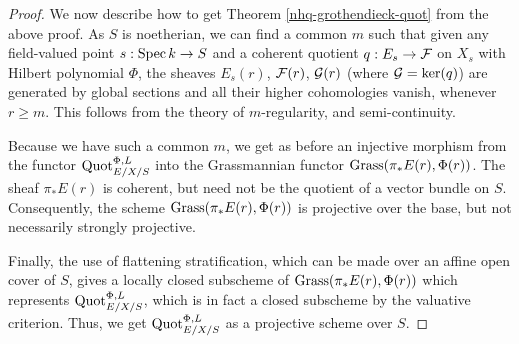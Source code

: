 \begin{proof}
We now describe how to get Theorem \ref{nhq-grothendieck-quot}
from the above proof. As $S$ is noetherian, we can find a common
$m$ such that given any field-valued point
$s: \operatorname{Spec} k\to S$ and a coherent quotient $q: E_s \to \mathcal{F}$ on $X_s$
with Hilbert polynomial $\Phi$,
the sheaves $E_s(r)$, $\mathcal{F}(r)$, $\mathcal{G}(r)$ (where $\mathcal{G} = \operatorname{ker}(q)$) are
generated by global sections and all their higher cohomologies vanish,
whenever $r\ge m$.
This follows from the theory of $m$-regularity, and semi-continuity.

Because we have such a common $m$, we get as before an injective morphism
from the functor $\operatorname{Quot}_{E/X/S}^{\Phi,L}$ into the Grassmannian functor
$\operatorname{Grass}(\pi_*E(r), \Phi(r))$. The sheaf
$\pi_*E(r)$ is coherent, but need not be the quotient of a
vector bundle on $S$. Consequently, the scheme $\operatorname{Grass}(\pi_*E(r), \Phi(r))$
is projective over the base, but not necessarily strongly projective.

Finally, the use of flattening stratification, which can be
made over an affine open cover of $S$, gives
a locally closed subscheme of $\operatorname{Grass}(\pi_*E(r), \Phi(r))$ which represents
$\operatorname{Quot}_{E/X/S}^{\Phi,L}$, which is in fact a
closed subscheme by the valuative criterion.
Thus, we get $\operatorname{Quot}_{E/X/S}^{\Phi,L}$ as a projective scheme over $S$.

\end{proof}
